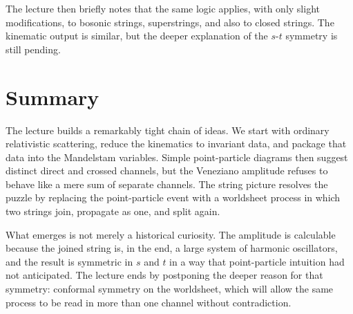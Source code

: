 The lecture then briefly notes that the same logic applies, with only slight modifications, to bosonic strings, superstrings, and also to closed strings. The kinematic output is similar, but the deeper explanation of the \(s\)-\(t\) symmetry is still pending.

\section{Summary}

The lecture builds a remarkably tight chain of ideas. We start with ordinary relativistic scattering, reduce the kinematics to invariant data, and package that data into the Mandelstam variables. Simple point-particle diagrams then suggest distinct direct and crossed channels, but the Veneziano amplitude refuses to behave like a mere sum of separate channels. The string picture resolves the puzzle by replacing the point-particle event with a worldsheet process in which two strings join, propagate as one, and split again.

What emerges is not merely a historical curiosity. The amplitude is calculable because the joined string is, in the end, a large system of harmonic oscillators, and the result is symmetric in \(s\) and \(t\) in a way that point-particle intuition had not anticipated. The lecture ends by postponing the deeper reason for that symmetry: conformal symmetry on the worldsheet, which will allow the same process to be read in more than one channel without contradiction.